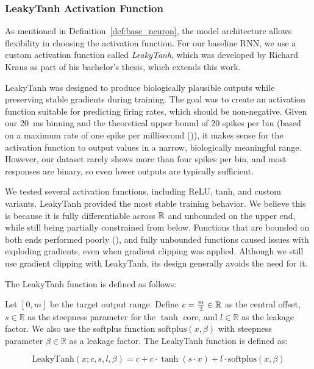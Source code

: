 \subsubsection{LeakyTanh Activation Function}
\label{subsubsec:leakytanh}

As mentioned in Definition~\ref{def:base_neuron}, the model architecture allows flexibility in choosing the activation function. For our baseline RNN, we use a custom activation function called \emph{LeakyTanh}, which was developed by Richard Kraus as part of his bachelor's thesis, which extends this work.

LeakyTanh was designed to produce biologically plausible outputs while preserving stable gradients during training. The goal was to create an activation function suitable for predicting firing rates, which should be non-negative. Given our 20~ms binning and the theoretical upper bound of 20 spikes per bin (based on a maximum rate of one spike per millisecond (\citet{dayan2005theoretical})), it makes sense for the activation function to output values in a narrow, biologically meaningful range. However, our dataset rarely shows more than four spikes per bin, and most responses are binary, so even lower outputs are typically sufficient.

We tested several activation functions, including ReLU, tanh, and custom variants. LeakyTanh provided the most stable training behavior. We believe this is because it is fully differentiable across $\mathbb{R}$ and unbounded on the upper end, while still being partially constrained from below. Functions that are bounded on both ends performed poorly (\citet{shiv2022activation, nwankpa2018activationfunctionscomparisontrends}), and fully unbounded functions caused issues with exploding gradients, even when gradient clipping was applied. Although we still use gradient clipping with LeakyTanh, its design generally avoids the need for it.

The LeakyTanh function is defined as follows:

\begin{defn}[LeakyTanh]
    Let $[0, m]$ be the target output range. Define $c = \frac{m}{2} \in \mathbb{R}$ as the central offset, $s \in \mathbb{R}$ as the steepness parameter for the $\tanh$ core, and $l \in \mathbb{R}$ as the leakage factor. We also use the softplus function $\text{softplus}(x, \beta)$ with steepness parameter $\beta \in \mathbb{R}$ as a leakage factor. The LeakyTanh function is defined as:
    
    $$\text{LeakyTanh}(x; c, s, l, \beta) = c + c \cdot \tanh(s \cdot x) + l \cdot \text{softplus}(x, \beta)$$
\end{defn}
\label{def:leakytanh}

